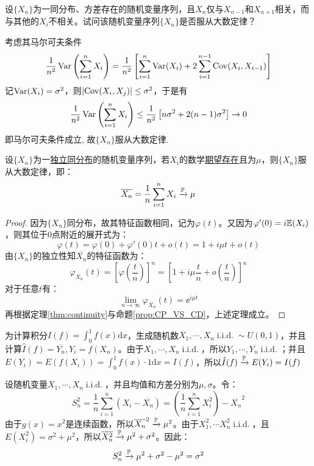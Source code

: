 \begin{example}\label{ex:4.2.3}
    设$\{ X_n \}$为一同分布、方差存在的随机变量序列，且$X_n$仅与$X_{n-1}$和$X_{n+1}$相关，而与其他的$X_i$不相关。试问该随机变量序列$\{ X_n \}$是否服从大数定律？
\end{example}
\begin{solution}
    考虑其马尔可夫条件
    \[ \frac1{n^2}\Var \left(\sum_{i=1}^n X_i \right) = \frac1{n^2} \left[ \sum_{i=1}^n \Var(X_i) + 2 \sum_{i=1}^{n-1} \Cov(X_i, X_{i-1})\right] \]
    记$\Var(X_i) = \sigma^2$，则$\abs{\Cov(X_i, X_j)}\leq \sigma^2$，于是有
    \[ \frac1{n^2}\Var \left(\sum_{i=1}^n X_i \right) \leq \frac1{n^2} \left[n \sigma^2 + 2(n - 1) \sigma^2\right] \to 0 \]
    即马尔可夫条件成立, 故$\{ X_n \}$服从大数定律.
\end{solution}

\begin{theorem}[（辛钦）弱大数定理]
    设$\{ X_n \}$为一\underline{独立同分布}的随机变量序列，若$X_i$的数学\underline{期望存在}且为$\mu$，则$\{ X_n \}$服从大数定律，即：
    \[ \overline{X_n}=\frac1n\sum_{i=1}^n X_i \xrightarrow{\P} \mu \]
\end{theorem}
\begin{proof}
    因为$\{ X_n \}$同分布，故其特征函数相同，记为$\varphi(t)$。又因为$\varphi'(0)=i \E(X_i)$，则其位于$0$点附近的展开式为：
    \[ \varphi(t)=\varphi(0)+\varphi'(0)t+o(t)=1+i \mu t +o(t) \]
    由$\{ X_n \}$的独立性知$\overline{X_n}$的特征函数为：
    \[ \varphi_{\overline{X_n}}(t)=\left[ \varphi(\frac{t}{n}) \right]^n=\left[ 1+i \mu \frac{t}{n} +o(\frac{t}{n}) \right]^n \]
    对于任意$t$有：
    \[ \lim_{n \to \infty} \varphi_{\overline{X_n}}(t) = \ee^{i \mu t}\]
    再根据定理\ref{thm:continuity}与命题\ref{prop:CP_VS_CD}，上述定理成立。
\end{proof}

\begin{example}
    为计算积分$I(f)=\int_0^1 f(x)\mathrm{d}x$，生成随机数$X_1,\cdots ,X_n \operatorname{i.i.d.} \sim U(0,1)$，并且计算$\hat{I}(f)=\overline{Y_n}, Y_i=f(X_n)$。由于$X_1,\cdots ,X_n \operatorname{i.i.d.}$，所以$Y_1,\cdots ,Y_n \operatorname{i.i.d.}$；并且$E(Y_i)=E(f(X_i))=\int_0^1 f(x)\cdot 1\mathrm{d}x=I(f)$，所以$\hat{I}(f)\xrightarrow{\P} E(Y_i)=I(f)$
\end{example}

\begin{example}[样本方差]\label{ex:sample_var}
    设随机变量$X_1,\cdots ,X_n \operatorname{i.i.d.}$，并且均值和方差分别为$\mu,\sigma$。令：
    \[ S_n^2=\frac1n\sum_{i=1}^n(X_i-\overline{X_n}) =(\frac1n\sum_{i=1}^nX_i^2)-\overline{X_n}^2 \]
    由于$g(x)=x^2$是连续函数，所以$\overline{X_n}^2 \xrightarrow{\P} \mu^2$。由于$X_1^2,\cdots X_n^2 \operatorname{i.i.d.}$，且$E(X_i^2)=\sigma^2+\mu^2$，所以$\overline{X_n^2} \xrightarrow{\P} \mu^2+\sigma^2$。因此：
    \[ S_n^2 \xrightarrow{\P}\mu^2+\sigma^2-\mu^2= \sigma^2 \]
\end{example}


